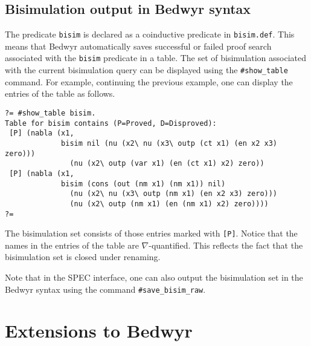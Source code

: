 \documentclass{article}
\newcommand\obj[1]{\texttt{#1}}
\begin{document}
\subsection{Bisimulation output in Bedwyr syntax}

The predicate \obj{bisim} is declared as a coinductive predicate in \obj{bisim.def}.
This means that Bedwyr automatically saves successful or failed proof search
associated with the \obj{bisim} predicate in a table. The set of bisimulation
associated with the current bisimulation query can be displayed using the
\obj{\#show\_table} command. For example, continuing the previous example,
one can display the entries of the table as follows. 

\begin{verbatim}
?= #show_table bisim.
Table for bisim contains (P=Proved, D=Disproved):
 [P] (nabla (x1,
             bisim nil (nu (x2\ nu (x3\ outp (ct x1) (en x2 x3) zero)))
               (nu (x2\ outp (var x1) (en (ct x1) x2) zero))
 [P] (nabla (x1,
             bisim (cons (out (nm x1) (nm x1)) nil)
               (nu (x2\ nu (x3\ outp (nm x1) (en x2 x3) zero)))
               (nu (x2\ outp (nm x1) (en (nm x1) x2) zero))))
?= 
\end{verbatim}
The bisimulation set consists of those entries marked with \obj{[P]}.
Notice that the names in the entries of the table are $\nabla$-quantified.
This reflects the fact that the bisimulation set is closed under
renaming. 

Note that in the SPEC interface, one can also output the bisimulation set
in the Bedwyr syntax using the command \obj{\#save\_bisim\_raw}.

\section{Extensions to Bedwyr}
\label{sec:bedwyr-ext}

\end{document}
